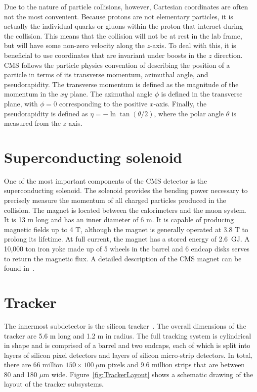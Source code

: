 Due to the nature of particle collisions, however, Cartesian coordinates are often not the most convenient. Because protons are not elementary particles, it is actually the individual quarks or gluons within the proton that interact during the collision. This means that the collision will not be at rest in the lab frame, but will have some non-zero velocity along the $z$-axis. To deal with this, it is beneficial to use coordinates that are invariant under boosts in the $z$ direction. CMS follows the particle physics convention of describing the position of a particle in terms of its transverse momentum, azimuthal angle, and pseudorapidity. The transverse momentum \pt is defined as the magnitude of the momentum in the $xy$ plane. The azimuthal angle $\phi$ is defined in the transverse plane, with $\phi  = 0$ corresponding to the positive $x$-axis. Finally, the pseudorapidity is defined as $\eta = -\ln{\tan{ (\theta / 2 )} } $, where the polar angle $\theta$ is measured from the $z$-axis.


\section{Superconducting solenoid}
\label{sec:magnet}

One of the most important components of the CMS detector is the superconducting solenoid. The solenoid provides the bending power necessary to precisely measure the momentum of all charged particles produced in the collision. The magnet is located between the calorimeters and the muon system. It is 13 m long and has an inner diameter of 6 m. It is capable of producing magnetic fields up to 4 T, although the magnet is generally operated at 3.8 T to prolong its lifetime. At full current, the magnet has a stored energy of 2.6~GJ. A 10,000 ton iron yoke made up of 5 wheels in the barrel and 6 endcap disks serves to return the magnetic flux. A detailed description of the CMS magnet can be found in~\cite{magnetTDR}.


\section{Tracker}
\label{sec:Tracker}

The innermost subdetector is the silicon tracker~\cite{trackerTDR,trackerTDRAddendum}. The overall dimensions of the tracker are 5.6 m long and 1.2 m in radius. The full tracking system is cylindrical in shape and is comprised of a barrel and two endcaps, each of which is split into layers of silicon pixel detectors and layers of silicon micro-strip detectors. In total, there are 66 million $150\times100~\mu$m pixels and 9.6 million strips that are between 80 and 180 $\mu$m wide. Figure~\ref{fig:TrackerLayout} shows a schematic drawing of the layout of the tracker subsystems. 

